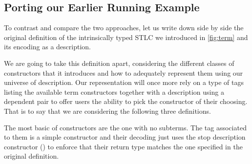 \subsection{Porting our Earlier Running Example}

To contrast and compare the two approaches, let us write down side by side
the original definition of the intrinsically typed STLC we introduced in
\cref{fig:term} and its encoding as a description.

We are going to take this definition apart, considering the different
classes of constructors that it introduces and how to adequately represent
them using our universe of description. Our representation will once more
rely on a type  of tags listing the available term constructors
together with a description  using a dependent pair to offer users
the ability to pick the constructor of their choosing. That is to say that
we are considering the following three definitions.

\noindent\begin{minipage}[t]{0.5\textwidth}
\end{minipage}\begin{minipage}[t]{0.5\textwidth}
  \begin{AgdaSuppressSpace}
  \end{AgdaSuppressSpace}
\end{minipage}

The most basic of constructors are the one with no subterms. The tag
associated to them is a simple constructor and their decoding just
uses the stop description constructor () to enforce that
their return type matches the one specified in the original definition.

\noindent\begin{minipage}[t]{0.4\textwidth}
\end{minipage}\begin{minipage}[t]{0.6\textwidth}
  \begin{AgdaSuppressSpace}
  \end{AgdaSuppressSpace}
\end{minipage}

